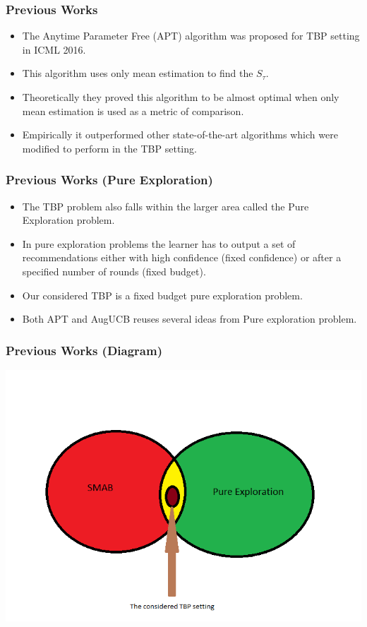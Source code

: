 \begin{frame}
\frametitle{Previous Works}
\begin{itemize}
\item<1-> The Anytime Parameter Free (APT) \cite{locatelli2016optimal} algorithm was proposed for TBP setting in ICML 2016. 
\item<2-> This algorithm uses only mean estimation to find the $S_{\tau}$. 
\item<3-> Theoretically they proved this algorithm to be almost optimal when only mean estimation is used as a metric of comparison.
\item<4-> Empirically it outperformed other state-of-the-art algorithms which were modified to perform in the TBP setting.  
\end{itemize}
\end{frame}


\begin{frame}
\frametitle{Previous Works (Pure Exploration)}
\begin{itemize}
\item<1-> The TBP problem also falls within the larger area called the Pure Exploration problem.
\item<2-> In pure exploration problems the learner has to output a set of recommendations either with high confidence (fixed confidence) or after a specified number of rounds (fixed budget).
\item<3-> Our considered TBP is a fixed budget pure exploration problem.
\item<4-> Both APT and AugUCB reuses several ideas from Pure exploration problem. 
\end{itemize}
\end{frame}

\begin{frame}
\frametitle{Previous Works (Diagram)}
\centering
\includegraphics[scale=0.5]{img/Settings.png}
\end{frame}

